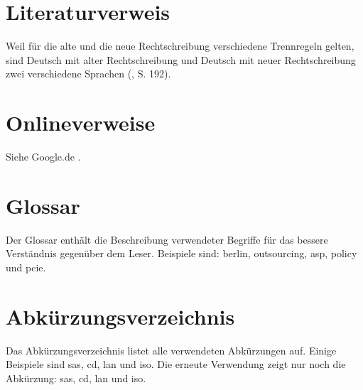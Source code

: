 \section{Literaturverweis}

Weil für die alte und die neue Rechtschreibung verschiedene Trennregeln gelten, sind Deutsch mit alter Rechtschreibung und Deutsch mit neuer Rechtschreibung zwei verschiedene Sprachen (\cite{Knappen2009}, S. 192).

\section{Onlineverweise}

Siehe Google.de \cite{Google2015}.

\section{Glossar}
Der Glossar enthält die Beschreibung verwendeter Begriffe für das bessere Verständnis gegenüber dem Leser. Beispiele sind: \gls{berlin}, \gls{outsourcing}, \gls{asp}, \gls{policy} und \gls{pcie}.

\section{Abkürzungsverzeichnis}
Das Abkürzungsverzeichnis listet alle verwendeten Abkürzungen auf. Einige Beispiele sind \gls{sas}, \gls{cd}, \gls{lan} und \gls{iso}. Die erneute Verwendung zeigt nur noch die Abkürzung: \gls{sas}, \gls{cd}, \gls{lan} und \gls{iso}.